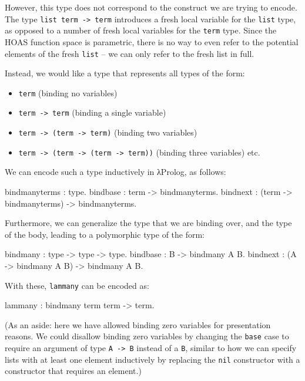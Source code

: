 \documentclass[format=acmlarge,review,anonymous]{acmart}\settopmatter{printfolios=true}
\begin{document}
However, this type does not correspond to the construct we are trying to
encode. The type \texttt{list term -> term} introduces a
fresh local variable for the \texttt{list} type, as opposed to a number
of fresh local variables for the \texttt{term} type. Since the HOAS
function space is parametric, there is no way to even refer to the
potential elements of the fresh \texttt{list} -- we can only refer to
the fresh list in full.

Instead, we would like a type that represents all types of the form:
\begin{itemize}
\item \texttt{term} (binding no variables)
\item \texttt{term -> term} (binding a single variable)
\item \texttt{term -> (term -> term)} (binding two variables)
\item \texttt{term -> (term -> (term -> term))} (binding three variables) etc.
\end{itemize}

We can encode such a type inductively in λProlog, as follows:

\begin{codequote}
bindmanyterms : type.
bindbase : term -> bindmanyterms.
bindnext : (term -> bindmanyterms) -> bindmanyterms.
\end{codequote}

Furthermore, we can generalize the type that we are binding over, and
the type of the body, leading to a polymorphic type of the form:

\begin{codequote}
bindmany : type -> type -> type.
bindbase : B -> bindmany A B.
bindnext : (A -> bindmany A B) -> bindmany A B.
\end{codequote}

With these, \texttt{lammany} can be encoded as:

\begin{codequote}
lammany : bindmany term term -> term.
\end{codequote}

(As an aside: here we have allowed binding zero variables for
presentation reasons. We could disallow binding zero variables by
changing the \texttt{base} case to require an argument of type
\texttt{A -> B} instead of a \texttt{B}, similar to how we
can specify lists with at least one element inductively by replacing the
\texttt{nil} constructor with a constructor that requires an element.)
\end{document}
